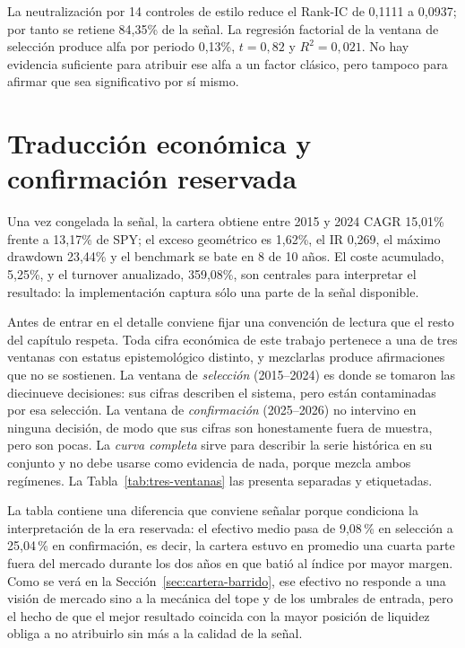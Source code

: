 La neutralización por 14 controles de estilo reduce el Rank-IC de 0,1111 a 0,0937; por tanto se
retiene 84,35\% de la señal. La regresión factorial de la ventana de selección produce alfa por
periodo 0,13\%, $t=0,82$ y $R^2=0,021$. No hay evidencia suficiente para atribuir ese alfa a un
factor clásico, pero tampoco para afirmar que sea significativo por sí mismo.

\section{Traducción económica y confirmación reservada}

Una vez congelada la señal, la cartera obtiene entre 2015 y 2024 CAGR 15,01\% frente a 13,17\% de
SPY; el exceso geométrico es 1,62\%, el IR 0,269, el máximo drawdown 23,44\% y el benchmark se bate
en 8 de 10 años. El coste acumulado, 5,25\%, y el turnover anualizado, 359,08\%, son centrales para
interpretar el resultado: la implementación captura sólo una parte de la señal disponible.

Antes de entrar en el detalle conviene fijar una convención de lectura que el resto del capítulo
respeta. Toda cifra económica de este trabajo pertenece a una de tres ventanas con estatus
epistemológico distinto, y mezclarlas produce afirmaciones que no se sostienen. La ventana de
\emph{selección} (2015--2024) es donde se tomaron las diecinueve decisiones: sus cifras describen
el sistema, pero están contaminadas por esa selección. La ventana de \emph{confirmación}
(2025--2026) no intervino en ninguna decisión, de modo que sus cifras son honestamente fuera de
muestra, pero son pocas. La \emph{curva completa} sirve para describir la serie histórica en su
conjunto y no debe usarse como evidencia de nada, porque mezcla ambos regímenes. La
Tabla~\ref{tab:tres-ventanas} las presenta separadas y etiquetadas.

\begin{table}[H]
  \centering
  \small
  \caption{Las tres ventanas de evaluación, con su papel declarado.}
  \label{tab:tres-ventanas}
  
  \caption*{Fuente: . Selección: se tomaron decisiones sobre ella.
  Confirmación: reservada, ninguna decisión la utilizó. Curva completa: descriptiva, no probatoria.}
\end{table}

La tabla contiene una diferencia que conviene señalar porque condiciona la interpretación de la era
reservada: el efectivo medio pasa de 9,08\,\% en selección a 25,04\,\% en confirmación, es decir,
la cartera estuvo en promedio una cuarta parte fuera del mercado durante los dos años en que batió
al índice por mayor margen. Como se verá en la Sección~\ref{sec:cartera-barrido}, ese efectivo no
responde a una visión de mercado sino a la mecánica del tope y de los umbrales de entrada, pero el
hecho de que el mejor resultado coincida con la mayor posición de liquidez obliga a no atribuirlo
sin más a la calidad de la señal.

